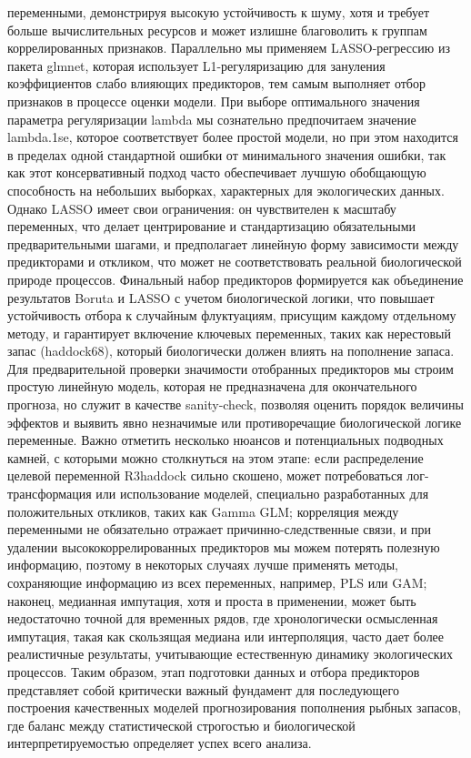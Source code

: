 \documentclass[
  letterpaper,
  DIV=11,
  numbers=noendperiod]{scrreprt}
\begin{document}
переменными, демонстрируя высокую устойчивость к шуму, хотя и требует
больше вычислительных ресурсов и может излишне благоволить к группам
коррелированных признаков. Параллельно мы применяем LASSO-регрессию из
пакета glmnet, которая использует L1-регуляризацию для зануления
коэффициентов слабо влияющих предикторов, тем самым выполняет отбор
признаков в процессе оценки модели. При выборе оптимального значения
параметра регуляризации lambda мы сознательно предпочитаем значение
lambda.1se, которое соответствует более простой модели, но при этом
находится в пределах одной стандартной ошибки от минимального значения
ошибки, так как этот консервативный подход часто обеспечивает лучшую
обобщающую способность на небольших выборках, характерных для
экологических данных. Однако LASSO имеет свои ограничения: он
чувствителен к масштабу переменных, что делает центрирование и
стандартизацию обязательными предварительными шагами, и предполагает
линейную форму зависимости между предикторами и откликом, что может не
соответствовать реальной биологической природе процессов. Финальный
набор предикторов формируется как объединение результатов Boruta и LASSO
с учетом биологической логики, что повышает устойчивость отбора к
случайным флуктуациям, присущим каждому отдельному методу, и гарантирует
включение ключевых переменных, таких как нерестовый запас (haddock68),
который биологически должен влиять на пополнение запаса. Для
предварительной проверки значимости отобранных предикторов мы строим
простую линейную модель, которая не предназначена для окончательного
прогноза, но служит в качестве sanity-check, позволяя оценить порядок
величины эффектов и выявить явно незначимые или противоречащие
биологической логике переменные. Важно отметить несколько нюансов и
потенциальных подводных камней, с которыми можно столкнуться на этом
этапе: если распределение целевой переменной R3haddock сильно скошено,
может потребоваться лог-трансформация или использование моделей,
специально разработанных для положительных откликов, таких как Gamma
GLM; корреляция между переменными не обязательно отражает
причинно-следственные связи, и при удалении высококоррелированных
предикторов мы можем потерять полезную информацию, поэтому в некоторых
случаях лучше применять методы, сохраняющие информацию из всех
переменных, например, PLS или GAM; наконец, медианная импутация, хотя и
проста в применении, может быть недостаточно точной для временных рядов,
где хронологически осмысленная импутация, такая как скользящая медиана
или интерполяция, часто дает более реалистичные результаты, учитывающие
естественную динамику экологических процессов. Таким образом, этап
подготовки данных и отбора предикторов представляет собой критически
важный фундамент для последующего построения качественных моделей
прогнозирования пополнения рыбных запасов, где баланс между
статистической строгостью и биологической интерпретируемостью определяет
успех всего анализа.
\end{document}
